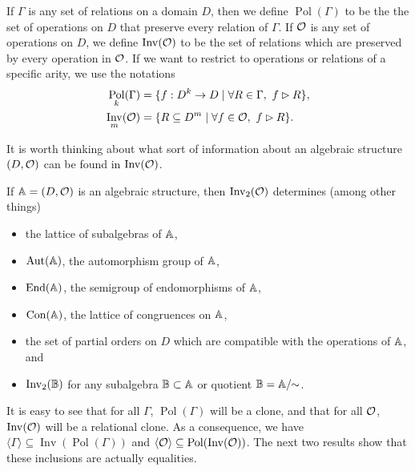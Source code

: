 \documentclass[letterpaper,11pt]{article}
\DeclareMathOperator{\Pol}{Pol}
\DeclareMathOperator{\Inv}{Inv}
\DeclareMathOperator{\Aut}{Aut}
\DeclareMathOperator{\End}{End}
\DeclareMathOperator{\Con}{Con}
\begin{document}
\begin{defn} If $\Gamma$ is any set of relations on a domain $D$, then we define $\Pol(\Gamma)$ to be the the set of operations on $D$ that preserve every relation of $\Gamma$. If $\mathcal{O}$ is any set of operations on $D$, we define $\Inv(\cO)$ to be the set of relations which are preserved by every operation in $\mathcal{O}$. If we want to restrict to operations or relations of a specific arity, we use the notations
\begin{align*}
\Pol_k(\Gamma) &= \{f : D^k \rightarrow D \mid \forall R \in \Gamma,\ f \rhd R\},\\
\Inv_m(\cO) &= \{R \subseteq D^m \mid \forall f \in \cO,\ f \rhd R\}.
\end{align*}
\end{defn}

It is worth thinking about what sort of information about an algebraic structure $(D, \mathcal{O})$ can be found in $\Inv(\cO)$.

\begin{ex} If $\mathbb{A} = (D, \mathcal{O})$ is an algebraic structure, then $\Inv_2(\cO)$ determines (among other things)
\begin{itemize}
\item the lattice of subalgebras of $\mathbb{A}$,

\item $\Aut(\bA)$, the automorphism group of $\mathbb{A}$,

\item $\End(\bA)$, the semigroup of endomorphisms of $\mathbb{A}$,

\item $\Con(\bA)$, the lattice of congruences on $\mathbb{A}$,

\item the set of partial orders on $D$ which are compatible with the operations of $\mathbb{A}$, and

\item $\Inv_2(\bB)$ for any subalgebra $\mathbb{B} \subset \mathbb{A}$ or quotient $\mathbb{B} = \mathbb{A}/\!\!\sim$.
\end{itemize}
\end{ex}

It is easy to see that for all $\Gamma$, $\Pol(\Gamma)$ will be a clone, and that for all $\mathcal{O}$, $\Inv(\cO)$ will be a relational clone. As a consequence, we have $\langle \Gamma \rangle \subseteq \Inv(\Pol(\Gamma))$ and $\langle \cO \rangle \subseteq \Pol(\Inv(\cO))$. The next two results show that these inclusions are actually equalities.
\end{document}
